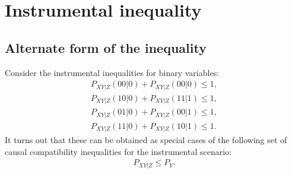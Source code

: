 \documentclass[aps,english,superscriptaddress,onecolumn,twoside,longbibliography,pra,floatfix,fleqn,nofootinbib]{revtex4-1}%
\theoremstyle{definition}
\begin{document}

\section{Instrumental inequality}

\subsection{Alternate form of the inequality}

Consider  the instrumental inequalities for binary variables:
\begin{align}
P_{XY|Z}(00|0) +  P_{XY|Z}(00|0) \le 1,\nonumber\\
P_{XY|Z}(10|0) +  P_{XY|Z}(11|1) \le 1,\nonumber\\
P_{XY|Z}(01|0) +  P_{XY|Z}(00|1) \le 1,\nonumber\\
P_{XY|Z}(11|0) +  P_{XY|Z}(10|1) \le 1. \label{II1}
\end{align}
It turns out that these can be obtained as special cases of the following set of causal compatibility inequalities for the instrumental scenario:
\begin{align}
P_{XY|Z} \le P_Y.
\label{II2}
\end{align}
\end{document}
